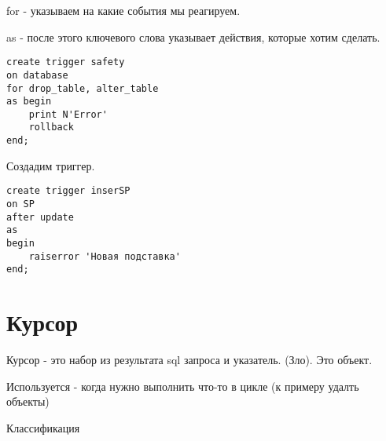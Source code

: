 for - указываем на какие события мы реагируем.

as - после этого ключевого слова указывает действия, которые хотим сделать.

\begin{lstlisting}[label=some-code,caption=Пример DDL триггера.]
create trigger safety 
on database
for drop_table, alter_table
as begin
	print N'Error'
	rollback 
end;
\end{lstlisting}

Создадим триггер.

\begin{lstlisting}[label=some-code,caption=Создадим триггер.]
create trigger inserSP
on SP
after update
as 
begin
	raiserror 'Новая подставка'
end;
\end{lstlisting}

\section{Курсор}

Курсор - это набор из результата sql запроса и указатель. (Зло). Это объект.

Используется - когда нужно выполнить что-то в цикле (к примеру удалть объекты)

Классификация

